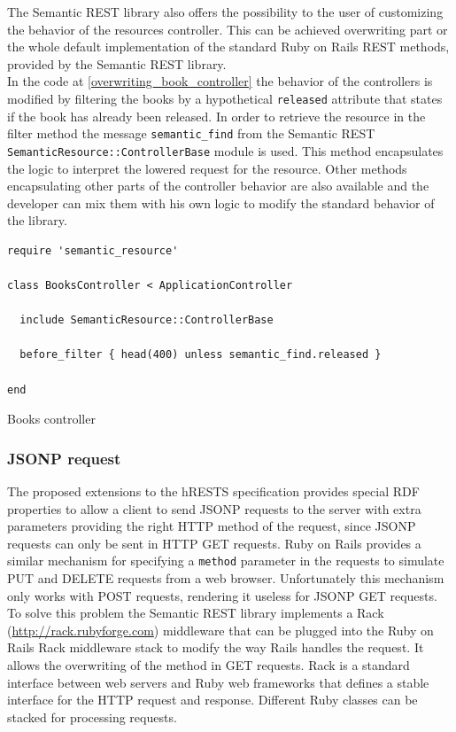 The Semantic REST library also offers the possibility to the user of customizing the behavior of the resources
controller. This can be achieved overwriting part or the whole default implementation of the standard Ruby on Rails
REST methods, provided by the Semantic REST library.\\
In the code at \ref{overwriting_book_controller} the behavior of the controllers is modified by filtering the
books by a hypothetical \texttt{released} attribute that states if the book has already been released. In order to
retrieve the resource in the filter method the message \texttt{semantic\_find} from the Semantic REST
\texttt{SemanticResource::ControllerBase} module is used. This method encapsulates the logic to interpret the lowered
request for the resource. Other methods encapsulating other parts of the controller behavior are also available and the
developer can mix them with his own logic to modify the standard behavior of the library.

\begin{table}
\vspace{5 mm}
\begin{lstlisting}
require 'semantic_resource'

class BooksController < ApplicationController  
  
  include SemanticResource::ControllerBase

  before_filter { head(400) unless semantic_find.released }

end
\end{lstlisting} 
\vspace{5 mm}
\caption{Books controller}
\label{overwriting_bok_controller}
\end{table}

\subsubsection{JSONP request}

The proposed extensions to the hRESTS specification provides special RDF properties to allow a client to send JSONP
requests to the server with extra parameters providing the right HTTP method of the request, since JSONP requests can
only be sent in HTTP GET requests. Ruby on Rails provides a similar mechanism for specifying a
\texttt{method} parameter in the requests to simulate PUT and DELETE requests from a web browser. Unfortunately this
mechanism only works with POST requests, rendering it useless for JSONP GET requests.\\
To solve this problem the Semantic REST library implements a Rack (\url{http://rack.rubyforge.com}) middleware that can be plugged into the Ruby on
Rails Rack middleware stack to modify the way Rails handles the request. It allows the overwriting of the method in GET
requests. Rack is a standard interface between web servers and Ruby web frameworks that defines a stable interface for
the HTTP request and response. Different Ruby classes can be stacked for processing requests.\\

